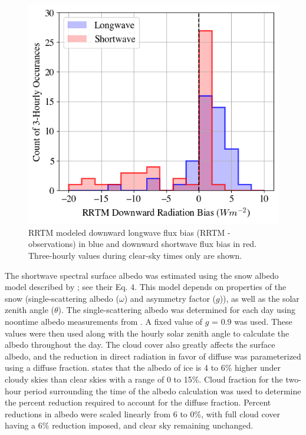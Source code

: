 \begin{figure}[b!]
    \centering
    \includegraphics[width=0.65\linewidth]{figures/chapter4/RRTMcorrelation_bias.png}
    \caption[RRTM modeled downward flux bias histogram.]{RRTM modeled downward longwave flux bias (RRTM - observations) in blue and downward shortwave flux bias in red. Three-hourly values during clear-sky times only are shown.}
    \label{fig:rrtm}
\end{figure}

The shortwave spectral surface albedo was estimated using the snow albedo model described by \citet{wiscombe:1980}; see their Eq. 4. This model depends on properties of the snow (single-scattering albedo ($\omega$) and asymmetry factor ($g$)), as well as the solar zenith angle ($\theta$). The single-scattering albedo was determined for each day using noontime albedo measurements from \citet{walden:2017}. A fixed value of $g$ = 0.9 was used. These values were then used along with the hourly solar zenith angle to calculate the albedo throughout the day. The cloud cover also greatly affects the surface albedo, and the reduction in direct radiation in favor of diffuse was parameterized using a diffuse fraction. \citet{key:2001} states that the albedo of ice is 4 to 6$\%$ higher under cloudy skies than clear skies with a range of 0 to 15$\%$. Cloud fraction for the two-hour period surrounding the time of the albedo calculation was used to determine the percent reduction required to account for the diffuse fraction. Percent reductions in albedo were scaled linearly from 6 to 0$\%$, with full cloud cover having a 6$\%$ reduction imposed, and clear sky remaining unchanged.

